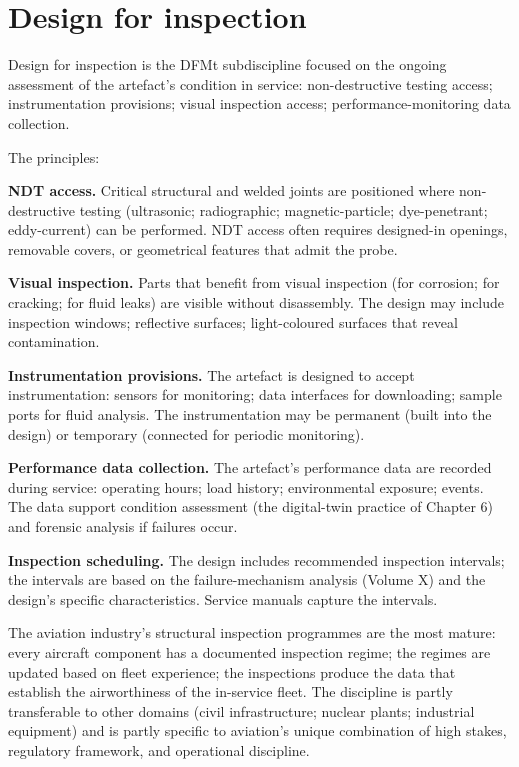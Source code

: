 \section{Design for inspection}

Design for inspection is the DFMt subdiscipline focused on the ongoing assessment of the artefact's condition in service: non-destructive testing access; instrumentation provisions; visual inspection access; performance-monitoring data collection.

The principles:

\textbf{NDT access.} Critical structural and welded joints are positioned where non-destructive testing (ultrasonic; radiographic; magnetic-particle; dye-penetrant; eddy-current) can be performed. NDT access often requires designed-in openings, removable covers, or geometrical features that admit the probe.

\textbf{Visual inspection.} Parts that benefit from visual inspection (for corrosion; for cracking; for fluid leaks) are visible without disassembly. The design may include inspection windows; reflective surfaces; light-coloured surfaces that reveal contamination.

\textbf{Instrumentation provisions.} The artefact is designed to accept instrumentation: sensors for monitoring; data interfaces for downloading; sample ports for fluid analysis. The instrumentation may be permanent (built into the design) or temporary (connected for periodic monitoring).

\textbf{Performance data collection.} The artefact's performance data are recorded during service: operating hours; load history; environmental exposure; events. The data support condition assessment (the digital-twin practice of Chapter 6) and forensic analysis if failures occur.

\textbf{Inspection scheduling.} The design includes recommended inspection intervals; the intervals are based on the failure-mechanism analysis (Volume X) and the design's specific characteristics. Service manuals capture the intervals.

The aviation industry's structural inspection programmes are the most mature: every aircraft component has a documented inspection regime; the regimes are updated based on fleet experience; the inspections produce the data that establish the airworthiness of the in-service fleet. The discipline is partly transferable to other domains (civil infrastructure; nuclear plants; industrial equipment) and is partly specific to aviation's unique combination of high stakes, regulatory framework, and operational discipline.

